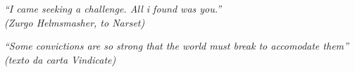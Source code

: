 \begin{epigrafe}
    \vspace*{\fill}
	\begin{flushright}
		\textit{ “I came seeking a challenge. All i found was you.”\\
   (Zurgo Helmsmasher, to Narset)} \vspace*{\fill}
   
      \textit{ “Some convictions are so strong that the world must break to accomodate them”\\
   (texto da carta Vindicate)} \vspace*{\fill}
	\end{flushright}
\end{epigrafe}
